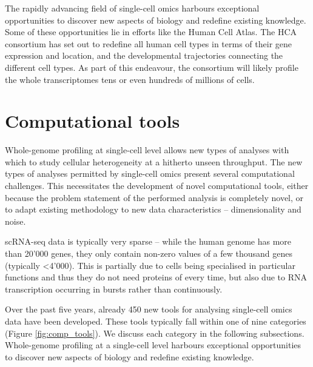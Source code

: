 The rapidly advancing field of single-cell omics harbours exceptional opportunities to discover new aspects of biology and redefine existing knowledge. Some of these opportunities lie in efforts like the Human Cell Atlas. The HCA consortium has set out to redefine all human cell types in terms of their gene expression and location, and the developmental trajectories connecting the different cell types. As part of this endeavour, the consortium will likely profile the whole transcriptomes tens or even hundreds of millions of cells. 

\section{Computational tools}
Whole-genome profiling at single-cell level allows new types of analyses with which to study cellular heterogeneity at a hitherto unseen throughput. 
The new types of analyses permitted by single-cell omics present several computational challenges\cite{stegle_computationalanalyticalchallenges_2015, yuan_challengesemergingdirections_2017, chen_singlecellrnaseqtechnologies_2019}. This necessitates the development of novel computational tools, either because the problem statement of the performed analysis is completely novel, or to adapt existing methodology to new data characteristics -- dimensionality and noise. 

scRNA-seq data is typically very sparse -- while the human genome has more than 20'000 genes, they only contain non-zero values of a few thousand genes (typically <4'000). This is partially due to cells being specialised in particular functions and thus they do not need proteins of every time, but also due to RNA transcription occurring in bursts rather than continuously\cite{nicolas_whatshapeseukaryotic_2017}.

Over the past five years, already 450 new tools for analysing single-cell omics data have been developed\cite{zappia_exploringsinglecellrnaseq_2018}. These tools typically fall within one of nine categories (Figure \ref{fig:comp_tools}). We discuss each category in the following subsections.
Whole-genome profiling at a single-cell level harbours exceptional opportunities to discover new aspects of biology and redefine existing knowledge.

